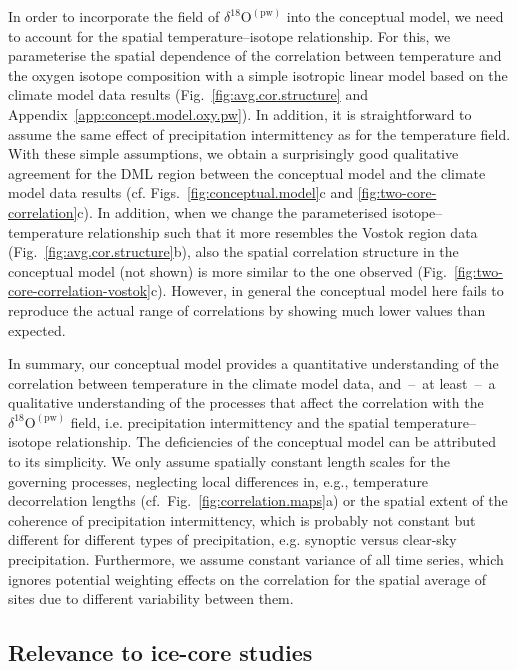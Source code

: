 \documentclass[cp, manuscript]{copernicus}
\begin{document}
In order to incorporate the field of $\delta^{18}\mathrm{O}^{\mathrm{(pw)}}$
into the conceptual model, we need to account for the spatial
temperature--isotope relationship. For this, we parameterise the spatial
dependence of the correlation between temperature and the oxygen isotope
composition with a simple isotropic linear model based on the climate model data
results (Fig.~\ref{fig:avg.cor.structure} and
Appendix~\ref{app:concept.model.oxy.pw}). In addition, it is straightforward to
assume the same effect of precipitation intermittency as for the temperature
field. With these simple assumptions, we obtain a surprisingly good qualitative
agreement for the DML region between the conceptual model and the climate model
data results (cf. Figs.~\ref{fig:conceptual.model}c and
\ref{fig:two-core-correlation}c). In addition, when we change the parameterised
isotope--temperature relationship such that it more resembles the Vostok region
data (Fig.~\ref{fig:avg.cor.structure}b), also the spatial correlation structure
in the conceptual model (not shown) is more similar to the one observed
(Fig.~\ref{fig:two-core-correlation-vostok}c). However, in general the
conceptual model here fails to reproduce the actual range of correlations by
showing much lower values than expected.

In summary, our conceptual model provides a quantitative understanding of the
correlation between temperature in the climate model data, and~--~at least~--~a
qualitative understanding of the processes that affect the correlation with the
$\delta^{18}\mathrm{O}^{\mathrm{(pw)}}$ field, i.e. precipitation intermittency
and the spatial temperature--isotope relationship. The deficiencies of the
conceptual model can be attributed to its simplicity. We only assume spatially
constant length scales for the governing processes, neglecting local differences
in, e.g., temperature decorrelation lengths
(cf.~Fig.~\ref{fig:correlation.maps}a) or the spatial extent of the coherence of
precipitation intermittency, which is probably not constant but different for
different types of precipitation, e.g. synoptic versus clear-sky precipitation.
Furthermore, we assume constant variance of all time series, which ignores
potential weighting effects on the correlation for the spatial average of sites
due to different variability between them.

\subsection{Relevance to ice-core studies}
\label{discussion:relevance}
\end{document}
